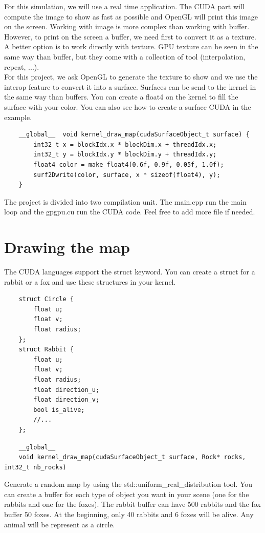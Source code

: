\documentclass{article}
\begin{document}
For this simulation, we will use a real time application. The CUDA part will compute the image to show as fast as possible and OpenGL will print this image on the screen. Working with image is more complex than working with buffer. However, to print on the screen a buffer, we need first to convert it as a texture. A better option is to work directly with texture. GPU texture can be seen in the same way than buffer, but they come with a collection of tool (interpolation, repeat, ...).\\
For this project, we ask OpenGL to generate the texture to show and we use the interop feature to convert it into a surface. Surfaces can be send to the kernel in the same way than buffers. You can create a float4 on the kernel to fill the surface with your color. You can also see how to create a surface CUDA in the example.
\begin{lstlisting}
	__global__  void kernel_draw_map(cudaSurfaceObject_t surface) {
		int32_t x = blockIdx.x * blockDim.x + threadIdx.x;
		int32_t y = blockIdx.y * blockDim.y + threadIdx.y;
		float4 color = make_float4(0.6f, 0.9f, 0.05f, 1.0f);
		surf2Dwrite(color, surface, x * sizeof(float4), y);
	}
\end{lstlisting}
The project is divided into two compilation unit. The main.cpp run the main loop and the gpgpu.cu run the CUDA code. Feel free to add more file if needed.

\newpage
\section{Drawing the map}
The CUDA languages support the struct keyword. You can create a struct for a rabbit or a fox and use these structures in your kernel.
\begin{lstlisting}
	struct Circle {
		float u;
		float v;
		float radius;
	};
	struct Rabbit {
		float u;
		float v;
		float radius;
		float direction_u;
		float direction_v;
		bool is_alive;
		//...
	};
\end{lstlisting}
\begin{lstlisting}
	__global__ 
	void kernel_draw_map(cudaSurfaceObject_t surface, Rock* rocks, int32_t nb_rocks)
\end{lstlisting}
Generate a random map by using the std::uniform\_real\_distribution tool. You can create a buffer for each type of object you want in your scene (one for the rabbits and one for the foxes). The rabbit buffer can have 500 rabbits and the fox buffer 50 foxes. At the beginning, only 40 rabbits and 6 foxes will be alive. Any animal will be represent as a circle.
\end{document}
